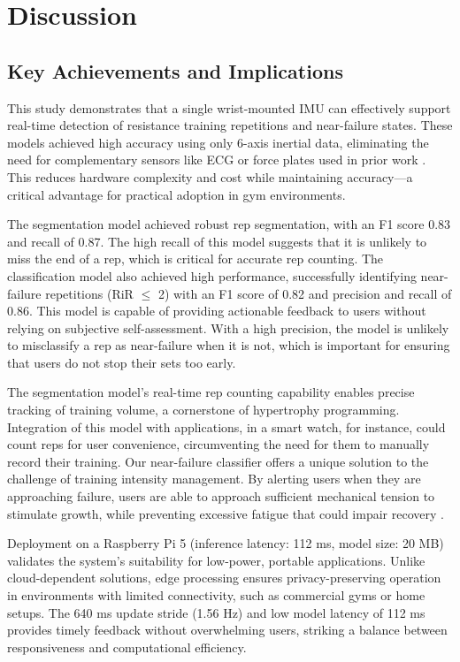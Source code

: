 \documentclass[conference]{IEEEtran}
\begin{document}
\section{Discussion}

\subsection{Key Achievements and Implications}
This study demonstrates that a single wrist-mounted IMU can effectively support real-time detection of resistance training repetitions and near-failure states. These models achieved high accuracy using only 6-axis inertial data, eliminating the need for complementary sensors like ECG or force plates used in prior work \cite{albert2021using, jiang2021data}. This reduces hardware complexity and cost while maintaining accuracy---a critical advantage for practical adoption in gym environments. 

The segmentation model achieved robust rep segmentation, with an F1 score 0.83 and recall of 0.87. The high recall of this model suggests that it is unlikely to miss the end of a rep, which is critical for accurate rep counting. The classification model also achieved high performance, successfully identifying near-failure repetitions (RiR $\le$ 2) with an F1 score of 0.82 and precision and recall of 0.86. This model is capable of providing actionable feedback to users without relying on subjective self-assessment. With a high precision, the model is unlikely to misclassify a rep as near-failure when it is not, which is important for ensuring that users do not stop their sets too early.

The segmentation model's real-time rep counting capability enables precise tracking of training volume, a cornerstone of hypertrophy programming. Integration of this model with applications, in a smart watch, for instance, could count reps for user convenience, circumventing the need for them to manually record their training. Our near-failure classifier offers a unique solution to the challenge of training intensity management. By alerting users when they are approaching failure, users are able to approach sufficient mechanical tension to stimulate growth, while preventing excessive fatigue that could impair recovery \cite{izquierdo2006differential}. 

Deployment on a Raspberry Pi 5 (inference latency: 112 ms, model size: 20 MB) validates the system's suitability for low-power, portable applications. Unlike cloud-dependent solutions, edge processing ensures privacy-preserving operation in environments with limited connectivity, such as commercial gyms or home setups. The 640 ms update stride (1.56 Hz) and low model latency of 112 ms provides timely feedback without overwhelming users, striking a balance between responsiveness and computational efficiency.
\end{document}
